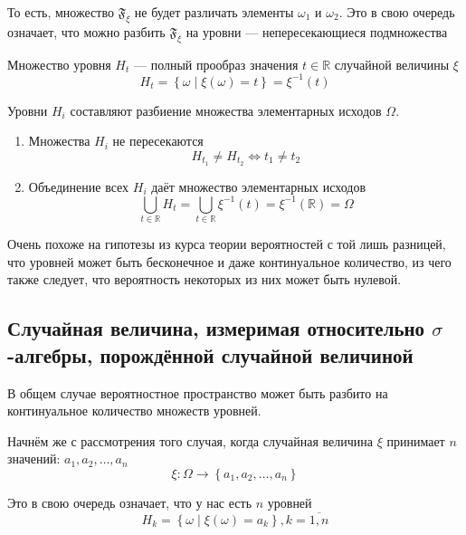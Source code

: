 То есть, множество $\mathfrak{F}_\xi$ не будет различать
элементы $\omega_1$ и $\omega_2$.
Это в свою очередь означает, что можно разбить $\mathfrak{F}_\xi$
на уровни --- непересекающиеся подмножества

\begin{definition}
    Множество уровня $H_t$ --- полный прообраз
    значения $t\in\mathbb{R}$ случайной величины $\xi$
    $$H_t
        = \left\{ \omega \mid \xi\left( \omega \right) = t \right\}
        = \xi^{-1}\left( t \right)$$
\end{definition}

\begin{remark}
    Уровни $H_i$ составляют разбиение множества элементарных исходов $\Omega$.
    \begin{enumerate}
        \item Множества $H_i$ не пересекаются
            $$H_{t_1} \neq H_{t_2} \Leftrightarrow t_1 \neq t_2$$
        \item Объединение всех $H_i$ даёт множество элементарных исходов
            $$\bigcup_{t \in \mathbb{R}} H_t
                = \bigcup_{t \in \mathbb{R}} \xi^{-1}\left( t \right)
                = \xi^{-1}\left( \mathbb{R} \right)
                = \Omega$$
    \end{enumerate}
\end{remark}

Очень похоже на гипотезы из курса теории вероятностей с той лишь разницей,
что уровней может быть бесконечное и даже континуальное количество,
из чего также следует, что вероятность некоторых из них может быть нулевой.

\subsection{Случайная величина, измеримая относительно $\sigma$-алгебры,
    порождённой случайной величиной}
В общем случае вероятностное пространство может быть разбито
на континуальное количество множеств уровней.

Начнём же с рассмотрения того случая,
когда случайная величина $\xi$ принимает $n$ значений:
$a_1, a_2, \dots, a_n$
$$\xi: \Omega \rightarrow \left\{ a_1, a_2, \dots, a_n \right\}$$

Это в свою очередь означает, что у нас есть $n$ уровней
$$H_k = \left\{ \omega \mid \xi\left( \omega \right) = a_k \right\},
    k=\overline{1,n}$$


